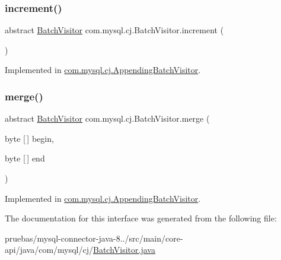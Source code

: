 \subsubsection{\texorpdfstring{increment()}{increment()}}
{\footnotesize\ttfamily abstract \mbox{\hyperlink{interfacecom_1_1mysql_1_1cj_1_1_batch_visitor}{Batch\+Visitor}} com.\+mysql.\+cj.\+Batch\+Visitor.\+increment (\begin{DoxyParamCaption}{ }\end{DoxyParamCaption})\hspace{0.3cm}{\ttfamily [abstract]}}



Implemented in \mbox{\hyperlink{classcom_1_1mysql_1_1cj_1_1_appending_batch_visitor_ad594c2e002438dcbc9079af8ee99c3c1}{com.\+mysql.\+cj.\+Appending\+Batch\+Visitor}}.

\mbox{\label{interfacecom_1_1mysql_1_1cj_1_1_batch_visitor_a29941741b1d70e0845b7164b8141231a}} 
\subsubsection{\texorpdfstring{merge()}{merge()}}
{\footnotesize\ttfamily abstract \mbox{\hyperlink{interfacecom_1_1mysql_1_1cj_1_1_batch_visitor}{Batch\+Visitor}} com.\+mysql.\+cj.\+Batch\+Visitor.\+merge (\begin{DoxyParamCaption}\item[{byte \mbox{[}$\,$\mbox{]}}]{begin,  }\item[{byte \mbox{[}$\,$\mbox{]}}]{end }\end{DoxyParamCaption})\hspace{0.3cm}{\ttfamily [abstract]}}



Implemented in \mbox{\hyperlink{classcom_1_1mysql_1_1cj_1_1_appending_batch_visitor_a75f638cd1726c922c747767d693c0288}{com.\+mysql.\+cj.\+Appending\+Batch\+Visitor}}.



The documentation for this interface was generated from the following file\+:\begin{DoxyCompactItemize}
\item 
pruebas/mysql-\/connector-\/java-\/8../src/main/core-\/api/java/com/mysql/cj/\mbox{\hyperlink{_batch_visitor_8java}{Batch\+Visitor.\+java}}\end{DoxyCompactItemize}
